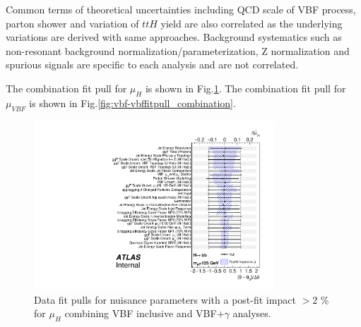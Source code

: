 Common terms of theoretical uncertainties including QCD scale of VBF process, parton shower and variation of $ttH$ yield are also correlated as the underlying variations are derived with same approaches. Background systematics such as non-resonant background normalization/parameterization, Z normalization and spurious signals are specific to each analysis and are not correlated.

The combination fit pull for $\mu_H$ is shown in Fig.\ref{fig:vbf-higgsfitpull_combination}. The combination fit pull for $\mu_{VBF}$ is shown in Fig.\ref{fig:vbf-vbffitpull_combination}.




\begin{figure}[htbp]
  \centering
 \includegraphics[width=0.8\textwidth]{figures/VBF/VBFHbb_Combined_pulls_125.pdf}
\caption{Data fit pulls for nuisance parameters with a post-fit impact $> 2$ \% for $\mu_H$ combining VBF inclusive and VBF$+\gamma$ analyses.}
  \label{fig:vbf-higgsfitpull_combination}
\end{figure}

